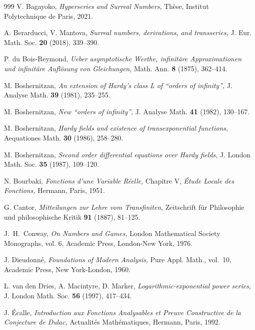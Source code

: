 \documentclass[]{amsart}
\numberwithin{equation}{section}
\theoremstyle{definition}
\theoremstyle{remark}
\begin{document}
\begin{thebibliography}{999}
 V. Bagayoko, {\em Hyperseries and Surreal Numbers,} Th\`ese,
Institut Polytechnique de Paris, 2021.

 A. Berarducci, V. Mantova, \textit{Surreal numbers, derivations, and transseries,} J. Eur. Math. Soc.  {\bf 20} (2018), 339--390. 


P. du Bois-Reymond, {\em Ueber asymptotische Werthe, infinit\"are Approximationen und infinit\"are Auf\-l\"o\-sung von Gleichungen,} Math. Ann. {\bf 8} (1875), 362--414.

M. Boshernitzan, {\it An extension of Hardy's class L of ``orders of infinity'',} J. Analyse Math. {\bf 39} (1981), 235--255.

M. Boshernitzan, {\it New ``orders of infinity'',} J. Analyse Math. {\bf 41} (1982), 130--167.

M. Boshernitzan, \textit{Hardy fields and existence of transexponential functions,}
Aequationes Math. {\bf 30} (1986),  258--280. 

M. Boshernitzan, \textit{Second order differential equations over Hardy fields,}
J. London Math. Soc.  {\bf 35} (1987),   109--120. 

N. Bourbaki,  {\em Fonctions d'une Variable R\'eelle,} Chapitre V, {\em \'Etude Locale des Fonctions,} Her\-mann, Paris, 1951.

G. Cantor, {\em Mitteilungen zur Lehre vom Transfiniten,} 
Zeitschrift f\"ur Philosophie und phi\-lo\-so\-phi\-sche Kritik {\bf 91} (1887), 81--125.

 J.~H.~Conway,
\textit{On Numbers and Games,}
London Mathematical Society Monographs, vol. 6, Academic Press, London-New York, 1976.

J. Dieudonn\'e, {\em Foundations of Modern Analysis,}
 Pure Appl. Math., vol.~10, Academic Press, New York-London, 1960.


L. van den Dries,  A. Macintyre, D. Marker, {\em Logarithmic-exponential power series,} J. London Math. Soc. {\bf 56} (1997), 417--434. 


J. \'Ecalle, \textit{Introduction aux Fonctions Analysables et Preuve Constructive de la Conjecture de Dulac,} Actualit\'es Math\'ematiques, Hermann, Paris, 1992.


\end{thebibliography}
\end{document}
